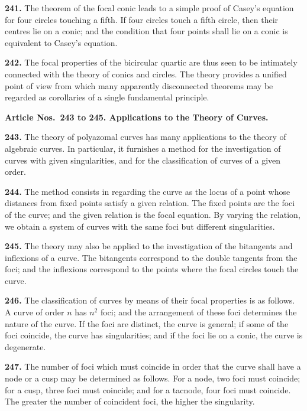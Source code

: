 \documentclass[12pt,a4paper]{article}
\theoremstyle{definition}
\begin{document}
\noindent\textbf{241.} The theorem of the focal conic leads to a simple proof of Casey's equation
for four circles touching a fifth. If four circles touch a fifth circle, then their centres
lie on a conic; and the condition that four points shall lie on a conic is equivalent to
Casey's equation.

\noindent\textbf{242.} The focal properties of the bicircular quartic are thus seen to be intimately
connected with the theory of conics and circles. The theory provides a unified point
of view from which many apparently disconnected theorems may be regarded as
corollaries of a single fundamental principle.

\vspace{0.5em}
\noindent\textbf{Article Nos.~243 to 245. Applications to the Theory of Curves.}

\vspace{0.3em}
\noindent\textbf{243.} The theory of polyazomal curves has many applications to the theory of
algebraic curves. In particular, it furnishes a method for the investigation of curves
with given singularities, and for the classification of curves of a given order.

\noindent\textbf{244.} The method consists in regarding the curve as the locus of a point whose
distances from fixed points satisfy a given relation. The fixed points are the foci of
the curve; and the given relation is the focal equation. By varying the relation, we
obtain a system of curves with the same foci but different singularities.

\noindent\textbf{245.} The theory may also be applied to the investigation of the bitangents and
inflexions of a curve. The bitangents correspond to the double tangents from the foci;
and the inflexions correspond to the points where the focal circles touch the curve.

\newpage
\noindent\textbf{246.} The classification of curves by means of their focal properties is as
follows. A curve of order $n$ has $n^2$ foci; and the arrangement of these foci determines
the nature of the curve. If the foci are distinct, the curve is general; if some of the
foci coincide, the curve has singularities; and if the foci lie on a conic, the curve is
degenerate.

\noindent\textbf{247.} The number of foci which must coincide in order that the curve shall
have a node or a cusp may be determined as follows. For a node, two foci must
coincide; for a cusp, three foci must coincide; and for a tacnode, four foci must coincide.
The greater the number of coincident foci, the higher the singularity.
\end{document}
